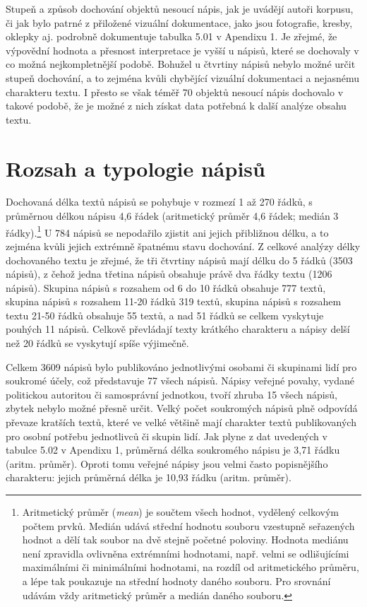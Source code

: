Stupeň a způsob dochování objektů nesoucí nápis, jak je uvádějí autoři korpusu, či jak bylo patrné z přiložené vizuální dokumentace, jako jsou fotografie, kresby, oklepky aj. podrobně dokumentuje tabulka 5.01 v Apendixu 1. Je zřejmé, že výpovědní hodnota a přesnost interpretace je vyšší u nápisů, které se dochovaly v co možná nejkompletnější podobě. Bohužel u čtvrtiny nápisů nebylo možné určit stupeň dochování, a to zejména kvůli chybějící vizuální dokumentaci a nejasnému charakteru textu. I přesto se však téměř 70  objektů nesoucí nápis dochovalo v takové podobě, že je možné z nich získat data potřebná k další analýze obsahu textu.

\section[rozsah-a-typologie-nápisů]{Rozsah a typologie nápisů}

Dochovaná délka textů nápisů se pohybuje v rozmezí 1 až 270 řádků, s průměrnou délkou nápisu 4,6 řádek (aritmetický průměr 4,6 řádek; medián 3 řádky).\footnote{Aritmetický průměr ({\em mean}) je součtem všech hodnot, vydělený celkovým počtem prvků. Medián udává střední hodnotu souboru vzestupně seřazených hodnot a dělí tak soubor na dvě stejně početné poloviny. Hodnota mediánu není zpravidla ovlivněna extrémními hodnotami, např. velmi se odlišujícími maximálními či minimálními hodnotami, na rozdíl od aritmetického průměru, a lépe tak poukazuje na střední hodnoty daného souboru. Pro srovnání udávám vždy aritmetický průměr a medián daného souboru.} U 784 nápisů se nepodařilo zjistit ani jejich přibližnou délku, a to zejména kvůli jejich extrémně špatnému stavu dochování. Z celkové analýzy délky dochovaného textu je zřejmé, že tři čtvrtiny nápisů mají délku do 5 řádků (3503 nápisů), z čehož jedna třetina nápisů obsahuje právě dva řádky textu (1206 nápisů). Skupina nápisů s rozsahem od 6 do 10 řádků obsahuje 777 textů, skupina nápisů s rozsahem 11-20 řádků 319 textů, skupina nápisů s rozsahem textu 21-50 řádků obsahuje 55 textů, a nad 51 řádků se celkem vyskytuje pouhých 11 nápisů. Celkově převládají texty krátkého charakteru a nápisy delší než 20 řádků se vyskytují spíše výjimečně.

Celkem 3609 nápisů bylo publikováno jednotlivými osobami či skupinami lidí pro soukromé účely, což představuje 77  všech nápisů. Nápisy veřejné povahy, vydané politickou autoritou či samosprávní jednotkou, tvoří zhruba 15  všech nápisů, zbytek nebylo možné přesně určit. Velký počet soukromých nápisů plně odpovídá převaze kratších textů, které ve velké většině mají charakter textů publikovaných pro osobní potřebu jednotlivců či skupin lidí. Jak plyne z dat uvedených v tabulce 5.02 v Apendixu 1, průměrná délka soukromého nápisu je 3,71 řádku (aritm. průměr). Oproti tomu veřejné nápisy jsou velmi často popisnějšího charakteru: jejich průměrná délka je 10,93 řádku (aritm. průměr).

